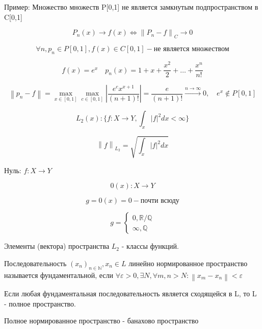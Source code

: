\documentclass[12pt, a4paper]{report}
\begin{document}
\fi


Пример: Множество множеств P[0,1] не является замкнутым подпространством в C[0,1]

\[ P_n (x )  \to  f(x ) \Leftrightarrow  \left\lVert P_n - f  \right\rVert _C \to  0 \]

\[ \forall  n , p_n \in  P[0,1] , f(x ) \in  C[0,1] - \text{не является множеством} \] 

\[ f(x ) = e ^{x} \quad  p_n(x) = 1+ x + \frac{x ^2 }{2 }  + \dots + \frac{x^n }{n!}  \]  

\[ \left\lVert p_n -f  \right\rVert = \max_{x \in [0,1]} \max_{c \in  [0,1]} \left\lvert \frac{e^c x^{x+1 } }{(n+1)!}  \right\rvert =\frac{e}{(n+1)!} \xrightarrow{n \to  \infty } 0 ,\quad e^x \notin P[0,1]       \] 



\[ L_2 (x ) :\{f: X \to  Y , \int_{x} |f| ^2 dx < \infty \} \] 

\[ \left\lVert f  \right\rVert _{L_2 } = \sqrt{\int_{x }|f| ^2 dx} \] 

Нуль: \( f : X \to  Y  \) 

\[  0(x ) : X \to  Y \] 

\[ g=0(x ) = 0 - \text{почти всюду}  \] 

\[ g = \begin{cases}
    0 , \mathbb{R}  /\mathbb{Q} \\
    \infty , \mathbb{Q}  
\end{cases} \] 


Элементы (вектора) пространства \( L_2    \)  - классы функций.

\begin{definition}
    Последовательность \( (x_n )_{n \in  \mathbb{N}} , x_n \in  L \) линейно нормированное пространство называется фундаментальной, если \( \forall  \varepsilon >0 , \exists N , \forall m,n >N : \left\lVert x_m - x_n  \right\rVert < \varepsilon \) 
\end{definition}

\begin{definition}
    Если любая фундаментальная последовательность является сходящейся в L, то L - полное пространство.
\end{definition}

\begin{definition}
    Полное нормированное пространство - банахово пространство
\end{definition}
\end{document}
